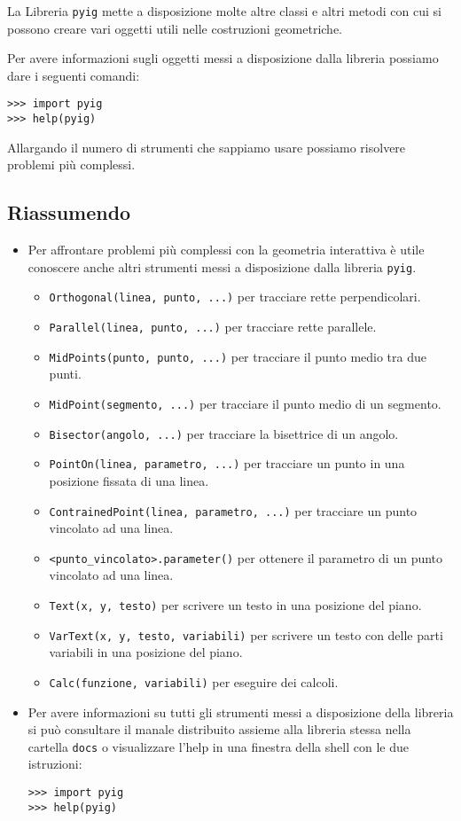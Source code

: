 La Libreria \lstinline{pyig} mette a disposizione molte altre classi e altri 
metodi con cui si possono creare vari oggetti utili nelle costruzioni 
geometriche. 

Per avere informazioni sugli oggetti messi a disposizione dalla libreria 
possiamo dare i seguenti comandi:
 \begin{lstlisting}[numbers=none]
>>> import pyig
>>> help(pyig)
 \end{lstlisting}

Allargando il numero di strumenti che sappiamo usare possiamo risolvere 
problemi più complessi.

\subsection{Riassumendo}
\begin{itemize} [noitemsep]
\item Per affrontare problemi più complessi con la geometria interattiva è 
utile conoscere anche altri strumenti messi a disposizione dalla libreria 
\lstinline{pyig}.
\begin{itemize}
 \item \lstinline{Orthogonal(linea, punto, ...)} 
 per tracciare rette perpendicolari.
 \item \lstinline{Parallel(linea, punto, ...)} 
 per tracciare rette parallele.
 \item \lstinline{MidPoints(punto, punto, ...)} 
 per tracciare il punto medio tra due punti.
 \item \lstinline{MidPoint(segmento, ...)} 
 per tracciare il punto medio di un segmento.
 \item \lstinline{Bisector(angolo, ...)} 
 per tracciare la bisettrice di un angolo.
 \item \lstinline{PointOn(linea, parametro, ...)} 
 per tracciare un punto in una posizione fissata di una linea.
 \item \lstinline{ContrainedPoint(linea, parametro, ...)} 
 per tracciare un punto vincolato ad una linea.
 \item \lstinline{<punto_vincolato>.parameter()} 
 per ottenere il parametro di un punto vincolato ad una linea.
 \item \lstinline{Text(x, y, testo)} 
 per scrivere un testo in una posizione del piano.
 \item \lstinline{VarText(x, y, testo, variabili)} 
 per scrivere un testo con delle parti variabili in una posizione del piano.
 \item \lstinline{Calc(funzione, variabili)} 
 per eseguire dei calcoli.
\end{itemize}
\item Per avere informazioni su tutti gli strumenti messi a disposizione della 
libreria si può consultare il manale distribuito assieme alla libreria stessa 
nella cartella \lstinline{docs} o visualizzare l'help in una finestra della 
shell con le due istruzioni:
 \begin{lstlisting}[numbers=none]
>>> import pyig
>>> help(pyig)
 \end{lstlisting}
\end{itemize}

